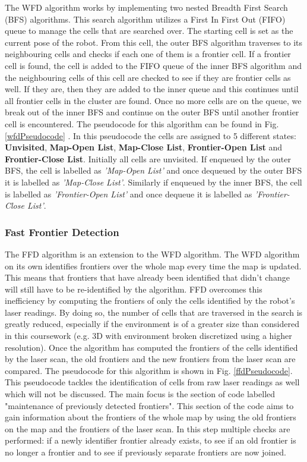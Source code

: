 \documentclass[a4paper,12pt]{article}
\begin{document}
				The WFD algorithm works by implementing two nested Breadth First Search (BFS) algorithms. This search algorithm utilizes a First In First Out (FIFO) queue to manage the cells that are searched over. The starting cell is set as the current pose of the robot. From this cell, the outer BFS algorithm traverses to its neighbouring cells and checks if each one of them is a frontier cell. If a frontier cell is found, the cell is added to the FIFO queue of the inner BFS algorithm and the neighbouring cells of this cell are checked to see if they are frontier cells as well. If they are, then they are added to the inner queue and this continues until all frontier cells in the cluster are found. Once no more cells are on the queue, we break out of the inner BFS and continue on the outer BFS until another frontier cell is encountered. The pseudocode for this algorithm can be found in Fig. \ref{wfdPseudocode} \cite{topiwala2018frontier}. In this pseudocode the cells are assigned to 5 different states: \textbf{Unvisited}, \textbf{Map-Open List}, \textbf{Map-Close List}, \textbf{Frontier-Open List} and \textbf{Frontier-Close List}. Initially all cells are unvisited. If enqueued by the outer BFS, the cell is labelled as \textit{'Map-Open List'} and once dequeued by the outer BFS it is labelled as \textit{'Map-Close List'}. Similarly if enqueued by the inner BFS, the cell is labelled as \textit{'Frontier-Open List'} and once dequeue it is labelled as \textit{'Frontier-Close List'}. 
				
				\subsubsection{Fast Frontier Detection}

				The FFD algorithm is an extension to the WFD algorithm. The WFD algorithm on its own identifies frontiers over the whole map every time the map is updated. This means that frontiers that have already been identified that didn't change will still have to be re-identified by the algorithm. FFD overcomes this inefficiency by computing the frontiers of only the cells identified by the robot's laser readings. By doing so, the number of cells that are traversed in the search is greatly reduced, especially if the environment is of a greater size than considered in this coursework (e.g. 3D with environment broken discretized using a higher resolution). Once the algorithm has computed the frontiers of the cells identified by the laser scan, the old frontiers and the new frontiers from the laser scan are compared. The pseudocode for this algorithm is shown in Fig. \ref{ffdPseudocode}. This pseudocode tackles the identification of cells from raw laser readings as well which will not be discussed. The main focus is the section of code labelled "maintenance of previously detected frontiers". This section of the code aims to gain information about the frontiers of the whole map by using the old frontiers on the map and the frontiers of the laser scan. In this step multiple checks are performed: if a newly identifier frontier already exists, to see if an old frontier is no longer a frontier and to see if previously separate frontiers are now joined. 
				
\end{document}
